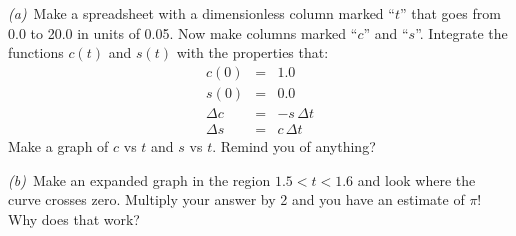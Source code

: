 \documentclass[12pt]{article}
\begin{document}
\textsl{(a)}~Make a spreadsheet with a dimensionless column marked
``$t$'' that goes from 0.0 to 20.0 in units of 0.05.  Now make columns
marked ``$c$'' and ``$s$''.  Integrate the functions $c(t)$ and
$s(t)$ with the properties that:
\begin{eqnarray}\displaystyle
c(0) & = & 1.0 \\
s(0) & = & 0.0 \\
\Delta c & = & -s\,\Delta t \\
\Delta s & = & c\,\Delta t
\end{eqnarray}
Make a graph of $c$ vs $t$ and $s$ vs $t$.  Remind you of anything?

\textsl{(b)}~Make an expanded graph in the region $1.5<t<1.6$ and
look where the curve crosses zero.  Multiply your answer by 2 and you
have an estimate of $\pi$!  Why does that work?
\end{document}
